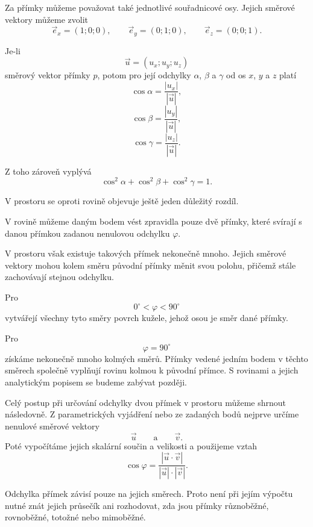 \begin{remark}
    \label{rem:Angle_line_coordinate_axes_space}
    Za přímky můžeme považovat také jednotlivé souřadnicové osy.
    Jejich směrové vektory můžeme zvolit
    \[
        \vec{e}_x=(1;0;0),
        \qquad
        \vec{e}_y=(0;1;0),
        \qquad
        \vec{e}_z=(0;0;1).
    \]

    Je-li
    \[
        \vec{u}=(u_x;u_y;u_z)
    \]
    směrový vektor přímky $p$, potom pro její odchylky
    $\alpha$, $\beta$ a $\gamma$ od os $x$, $y$ a $z$ platí
    \[
        \cos\alpha
        =
        \frac{|u_x|}{|\vec{u}|},
    \]
    \[
        \cos\beta
        =
        \frac{|u_y|}{|\vec{u}|},
    \]
    \[
        \cos\gamma
        =
        \frac{|u_z|}{|\vec{u}|}.
    \]

    Z toho zároveň vyplývá
    \[
        \cos^2\alpha
        +
        \cos^2\beta
        +
        \cos^2\gamma
        =
        1.
    \]
\end{remark}

\begin{remark}
    \label{rem:Infinitely_many_lines_given_angle_space}
    V prostoru se oproti rovině objevuje ještě jeden důležitý rozdíl.

    V rovině můžeme daným bodem vést zpravidla pouze dvě přímky,
    které svírají s danou přímkou zadanou nenulovou odchylku
    $\varphi$.

    V prostoru však existuje takových přímek nekonečně mnoho.
    Jejich směrové vektory mohou kolem směru původní přímky měnit
    svou polohu, přičemž stále zachovávají stejnou odchylku.

    Pro
    \[
        0^\circ<\varphi<90^\circ
    \]
    vytvářejí všechny tyto směry povrch kužele, jehož osou je směr
    dané přímky.

    Pro
    \[
        \varphi=90^\circ
    \]
    získáme nekonečně mnoho kolmých směrů. Přímky vedené jedním bodem
    v těchto směrech společně vyplňují rovinu kolmou k původní přímce.
    S rovinami a jejich analytickým popisem se budeme zabývat později.
\end{remark}

Celý postup při určování odchylky dvou přímek v prostoru můžeme
shrnout následovně. Z parametrických vyjádření nebo ze zadaných bodů
nejprve určíme nenulové směrové vektory
\[
    \vec{u}
    \qquad\text{a}\qquad
    \vec{v}.
\]
Poté vypočítáme jejich skalární součin a velikosti a použijeme vztah
\[
    \cos\varphi
    =
    \frac{
        |\vec{u}\cdot\vec{v}|
    }{
        |\vec{u}|\cdot|\vec{v}|
    }.
\]

Odchylka přímek závisí pouze na jejich směrech. Proto není při jejím
výpočtu nutné znát jejich průsečík ani rozhodovat, zda jsou přímky
různoběžné, rovnoběžné, totožné nebo mimoběžné.